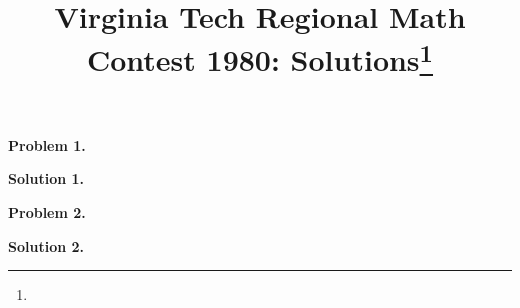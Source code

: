 \documentclass[10pt]{article}
\newcommand{\problem}[1]{\textbf{Problem #1.}}
\newcommand{\solution}[1]{\textbf{Solution #1.}}
\newcommand{\inputproblem}[2]{}
\begin{document}
\title{Virginia Tech Regional Math Contest 1980: Solutions\footnote{\disclaimer}}
\author{\vspace{-2ex}}
\date{\vspace{-5ex}} %
\maketitle

\problem{1}
\inputproblem{1980}{1}

\solution{1}


\problem{2}
\inputproblem{1980}{2}

\solution{2}


%

%

%

%

%

%
\end{document}
